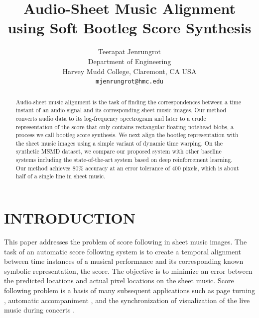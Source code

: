 \documentclass[letterpaper, 10pt, conference]{ieeeconf}  %
\title{\LARGE \bf
Audio-Sheet Music Alignment using Soft Bootleg Score Synthesis
}
\author{Teerapat Jenrungrot \\
        Department of Engineering \\
        Harvey Mudd College, Claremont, CA USA \\
        {\tt\small mjenrungrot@hmc.edu}%
}
\begin{document}


\maketitle
\thispagestyle{empty}
\pagestyle{empty}


\begin{abstract}

Audio-sheet music alignment is the task of finding the correspondences between a time instant of an audio signal and its corresponding sheet music images. Our method converts audio data to its log-frequency spectrogram and later to a crude representation of the score that only contains rectangular floating notehead blobs, a process we call bootleg score synthesis. We next align the bootleg representation with the sheet music images using a simple variant of dynamic time warping. On the synthetic MSMD dataset, we compare our proposed system with other baseline systems including the state-of-the-art system based on deep reinforcement learning. Our method achieves 80\% accuracy at an error tolerance of 400 pixels, which is about half of a single line in sheet music.

\end{abstract}

\section{INTRODUCTION}
This paper addresses the problem of score following in sheet music images. The task of an automatic score following system is to create a temporal alignment between time instances of a musical performance and its corresponding known symbolic representation, the score. The objective is to minimize an error between the predicted locations and actual pixel locations on the sheet music. Score following problem is a basis of many subsequent applications such as page turning \cite{page_turning}, automatic accompaniment \cite{accompaniment1, accompaniment2}, and the synchronization of visualization of the live music during concerts \cite{live1, live2}.
\end{document}
